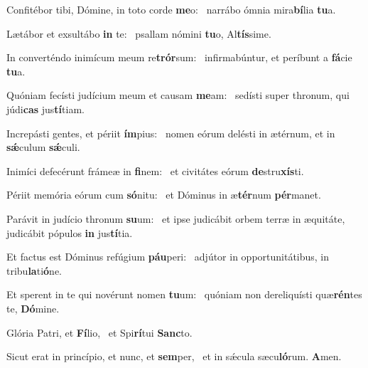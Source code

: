 \item Confitébor tibi, Dómine, in toto corde \textbf{me}o:~\psstar{} narrábo ómnia mira\textbf{bí}lia \textbf{tu}a.
\item Lætábor et exsultábo \textbf{in} te:~\psstar{} psallam nómini \textbf{tu}o, Al\textbf{tís}sime.
\item In converténdo inimícum meum re\textbf{trór}sum:~\psstar{} infirmabúntur, et períbunt a \textbf{fá}cie \textbf{tu}a.
\item Quóniam fecísti judícium meum et causam \textbf{me}am:~\psstar{} sedísti super thronum, qui júdi\textbf{cas} jus\textbf{tí}tiam.
\item Increpásti gentes, et périit \textbf{ím}pius:~\psstar{} nomen eórum delésti in ætérnum, et in \textbf{sǽ}culum \textbf{sǽ}culi.
\item Inimíci defecérunt frámeæ in \textbf{fi}nem:~\psstar{} et civitátes eórum \textbf{de}stru\textbf{xís}ti.
\item Périit memória eórum cum \textbf{só}nitu:~\psstar{} et Dóminus in æ\textbf{tér}num \textbf{pér}manet.
\item Parávit in judício thronum \textbf{su}um:~\psstar{} et ipse judicábit orbem terræ in æquitáte, judicábit pópulos \textbf{in} jus\textbf{tí}tia.
\item Et factus est Dóminus refúgium \textbf{páu}peri:~\psstar{} adjútor in opportunitátibus, in tribu\textbf{la}ti\textbf{ó}ne.
\item Et sperent in te qui novérunt nomen \textbf{tu}um:~\psstar{} quóniam non dereliquísti quæ\textbf{rén}tes te, \textbf{Dó}mine.
\item Glória Patri, et \textbf{Fí}lio,~\psstar{} et Spi\textbf{rí}tui \textbf{Sanc}to.
\item Sicut erat in princípio, et nunc, et \textbf{sem}per,~\psstar{} et in sǽcula sæcu\textbf{ló}rum. \textbf{A}men.
